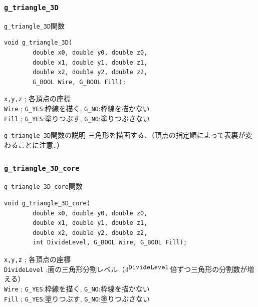 \documentclass[platex,a4paper,12pt]{jsarticle}%
\begin{document}
\clearpage
\subsubsection{\texttt{g\_triangle\_3D}}

\begin{itembox}[l]{\texttt{g\_triangle\_3D}関数}
\begin{verbatim}
void g_triangle_3D(
        double x0, double y0, double z0,
        double x1, double y1, double z1,
        double x2, double y2, double z2,
        G_BOOL Wire, G_BOOL Fill);
\end{verbatim}
\verb|x,y,z| ; 各頂点の座標\\
\verb|Wire| ; \verb|G_YES|:枠線を描く, \verb|G_NO|:枠線を描かない \\
\verb|Fill| ; \verb|G_YES|:塗りつぶす, \verb|G_NO|:塗りつぶさない 
\end{itembox}

\begin{itembox}[l]{\texttt{g\_triangle\_3D}関数の説明}
三角形を描画する．（頂点の指定順によって表裏が変わることに注意．）
\end{itembox}



\clearpage
\subsubsection{\texttt{g\_triangle\_3D\_core}}

\begin{itembox}[l]{\texttt{g\_triangle\_3D\_core}関数}
\begin{verbatim}
void g_triangle_3D_core(
        double x0, double y0, double z0,
        double x1, double y1, double z1,
        double x2, double y2, double z2,
        int DivideLevel, G_BOOL Wire, G_BOOL Fill);  
\end{verbatim}
\verb|x,y,z| ; 各頂点の座標\\
\verb|DivideLevel| ;面の三角形分割レベル（$4^{\verb|DivideLevel|}$倍ずつ三角形の分割数が増える）\\
\verb|Wire| ; \verb|G_YES|:枠線を描く, \verb|G_NO|:枠線を描かない \\
\verb|Fill| ; \verb|G_YES|:塗りつぶす, \verb|G_NO|:塗りつぶさない 
\end{itembox}
\end{document}
